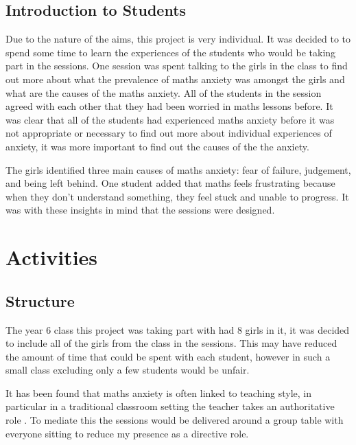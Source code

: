 \documentclass[11pt, a4paper, notitlepage]{article}
\begin{document}
\subsection{Introduction to Students}
Due to the nature of the aims, this project is very individual. It was decided to to spend some time to learn the experiences of the students who would be taking part in the sessions. One session was spent talking to the girls in the class to find out more about what the prevalence of maths anxiety was amongst the girls and what are the causes of the maths anxiety. All of the students in the session agreed with each other that they had been worried in maths lessons before. It was clear that all of the students had experienced maths anxiety before it was not appropriate or necessary to find out more about individual experiences of anxiety, it was more important to find out the causes of the the anxiety.
\par
The girls identified three main causes of maths anxiety: fear of failure, judgement, and being left behind. One student added that maths feels frustrating because when they don't understand something, they feel stuck and unable to progress. It was with these insights in mind that the sessions were designed.

\section{Activities}
\subsection{Structure}
The year 6 class this project was taking part with had 8 girls in it, it was decided to include all of the girls from the class in the sessions. This may have reduced the amount of time that could be spent with each student, however in such a small class excluding only a few students would be unfair. 
\par It has been found that maths anxiety is often linked to teaching style, in particular in a traditional classroom setting the teacher takes an authoritative role \cite{Finlayson:2014}. To mediate this the sessions would be delivered around a group table with everyone sitting to reduce my presence as a directive role. 
\end{document}
